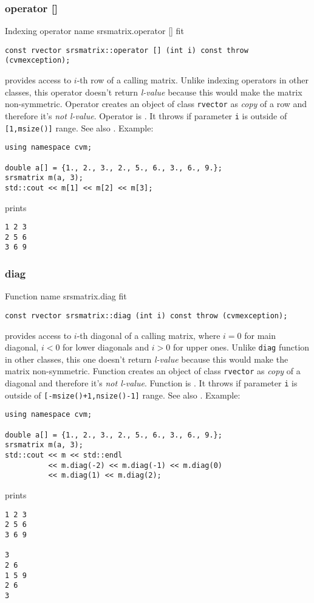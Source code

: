 \subsubsection{operator []}
Indexing operator%
\pdfdest name {srsmatrix.operator []} fit
\begin{verbatim}
const rvector srsmatrix::operator [] (int i) const throw (cvmexception);
\end{verbatim}
provides access to \hbox{$i$-th} row of a calling matrix.
Unlike indexing operators in other classes,
this operator doesn't return  \emph{l-value}
because this would make the matrix non-symmetric.
Operator creates an object of class \verb"rvector"
as  \emph{copy} of a row and therefore it's
\emph{not  l-value}.
Operator is \Based.
It throws 
if parameter \verb"i" is outside of \verb"[1,msize()]" range.
See also .
Example:
\begin{Verbatim}
using namespace cvm;

double a[] = {1., 2., 3., 2., 5., 6., 3., 6., 9.};
srsmatrix m(a, 3);
std::cout << m[1] << m[2] << m[3];
\end{Verbatim}
prints
\begin{Verbatim}
1 2 3
2 5 6
3 6 9
\end{Verbatim}
\newpage



\subsubsection{diag}
Function%
\pdfdest name {srsmatrix.diag} fit
\begin{verbatim}
const rvector srsmatrix::diag (int i) const throw (cvmexception);
\end{verbatim}
provides access to \hbox{$i$-th} diagonal of a calling matrix,
where $i=0$ for main diagonal, $i<0$ for lower diagonals 
and $i>0$ for upper ones.
Unlike \verb"diag" function in other classes,
this one doesn't return  \emph{l-value}
because this would make the matrix non-symmetric.
Function creates an object of class \verb"rvector"
as  \emph{copy} of a diagonal and therefore it's
\emph{not  l-value}.
Function is \Based.
It throws 
if parameter \verb"i" is outside of 
\verb"[-msize()+1,nsize()-1]" range.
See also .
Example:
\begin{Verbatim}
using namespace cvm;

double a[] = {1., 2., 3., 2., 5., 6., 3., 6., 9.};
srsmatrix m(a, 3);
std::cout << m << std::endl
          << m.diag(-2) << m.diag(-1) << m.diag(0)
          << m.diag(1) << m.diag(2);
\end{Verbatim}
prints
\begin{Verbatim}
1 2 3
2 5 6
3 6 9

3
2 6
1 5 9
2 6
3
\end{Verbatim}
\newpage



